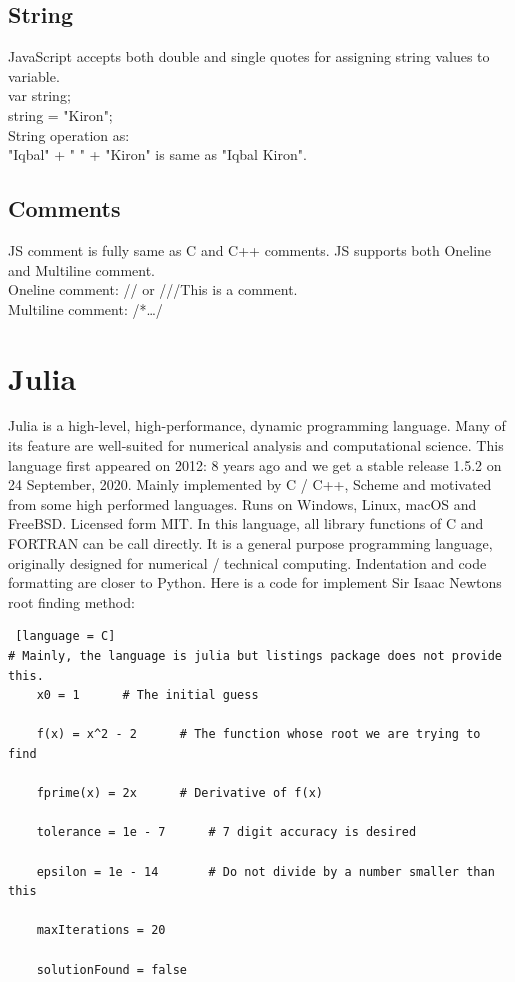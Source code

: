 \documentclass[10 pt]{book}
\begin{document}
\begin{enumerate}
\section{String}
JavaScript accepts both double and single quotes for assigning string values to variable.\\
var string;\\
string = "Kiron";\\
String operation as:\\
"Iqbal" + " " + "Kiron" is same as "Iqbal Kiron".
\section{Comments}
JS comment is fully same as C and C++ comments. JS supports both Oneline and Multiline comment.\\
Oneline comment: // or ///This is a comment.\\
Multiline comment: /*\dots*/

\chapter{Julia}
Julia is a high-level, high-performance, dynamic programming language. Many of its feature are well-suited for numerical analysis and computational science. This language first appeared on 2012: 8 years ago and we get a stable release 1.5.2 on 24 September, 2020. Mainly implemented by C / C++, Scheme and motivated from some high performed languages. Runs on Windows, Linux, macOS and FreeBSD. Licensed form MIT. In this language, all library functions of C and FORTRAN can be call directly. It is a general purpose programming language, originally designed for numerical / technical computing. Indentation and code formatting are closer to Python. Here is a code for implement Sir Isaac Newtons root finding method:
\begin{lstlisting} [language = C]
# Mainly, the language is julia but listings package does not provide this.
	x0 = 1		# The initial guess
	
	f(x) = x^2 - 2		# The function whose root we are trying to find
	
	fprime(x) = 2x		# Derivative of f(x)
	
	tolerance = 1e - 7		# 7 digit accuracy is desired
	
	epsilon = 1e - 14		# Do not divide by a number smaller than this
	
	maxIterations = 20
	
	solutionFound = false
	

\end{lstlisting}
\end{enumerate}
\end{document}
